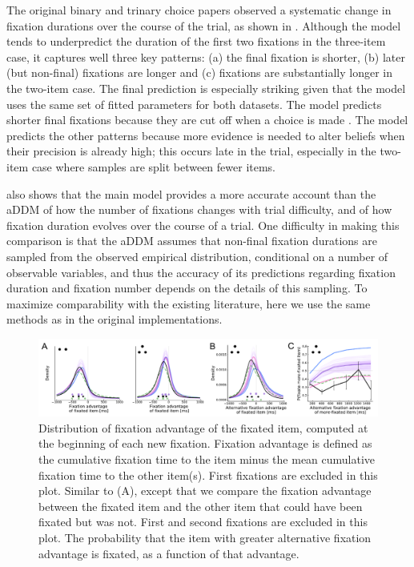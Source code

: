 The original binary and trinary choice papers observed a systematic change in fixation durations over the course of the trial, as shown in . Although the model tends to underpredict the duration of the first two fixations in the three-item case, it captures well three key patterns: (a) the final fixation is shorter, (b) later (but non-final) fixations are longer and (c) fixations are substantially longer in the two-item case. The final prediction is especially striking given that the model uses the same set of fitted parameters for both datasets. The model predicts shorter final fixations because they are cut off when a choice is made \citep{krajbich2010visual}. The model predicts the other patterns because more evidence is needed to alter beliefs when their precision is already high; this occurs late in the trial, especially in the two-item case where samples are split between fewer items.

 also shows that the main model provides a more accurate account than the aDDM of how the number of fixations changes with trial difficulty, and of how fixation duration evolves over the course of a trial. One difficulty in making this comparison is that the aDDM assumes that non-final fixation durations are sampled from the observed empirical distribution, conditional on a number of observable variables, and thus the accuracy of its predictions regarding fixation duration and fixation number depends on the details of this sampling. To maximize comparability with the existing literature, here we use the same methods as in the original implementations.

\begin{figure}[t!]
  \centering
  \includegraphics[width=\textwidth]{figs/attention/Fig5.pdf}
  \caption{
     Distribution of fixation advantage of the fixated item, computed at the beginning of each new fixation. Fixation advantage is defined as the cumulative fixation time to the item  minus the mean cumulative fixation time to the other item(s). First fixations are excluded in this plot.
     Similar to (A), except that we compare the fixation advantage between the fixated item and the other item that could have been fixated but was not. First and second fixations are excluded in this plot.
     The probability that the item with greater alternative fixation advantage is fixated, as a function of that advantage.
}
  \label{fig:attention5}
\end{figure}

